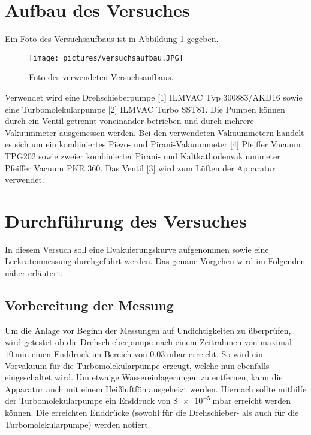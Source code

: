 \section{Aufbau des Versuches}
\label{sec:aufbau}
Ein Foto des Versuchsaufbaus ist in Abbildung \ref{fig:versuchsaufbau} gegeben.
\begin{figure}[H]
  \centering
  \caption{Foto des verwendeten Versuchsaufbaus.}
  \label{fig:versuchsaufbau}
  \texttt{[image: pictures/versuchsaufbau.JPG]}
\end{figure}
\noindent
Verwendet wird eine Drehschieberpumpe [1] ILMVAC Typ 300883/AKD16 sowie eine Turbomolekularpumpe [2]
ILMVAC Turbo SST81. Die Pumpen können durch ein Ventil getrennt voneinander betrieben und durch mehrere
Vakuummeter ausgemessen werden.
Bei den verwendeten Vakuummetern handelt es sich um ein kombiniertes
Piezo- und Pirani-Vakuummeter [4] Pfeiffer Vacuum TPG202 sowie zweier kombinierter Pirani- und Kaltkathodenvakuummeter
Pfeiffer Vacuum PKR 360. Das Ventil [3] wird zum Lüften der Apparatur verwendet.

\section{Durchführung des Versuches}
\label{sec:Durchführung}
In diesem Versuch soll eine Evakuierungskurve aufgenommen sowie eine Leckratenmessung
durchgeführt werden. Das genaue Vorgehen wird im Folgenden näher erläutert.

\subsection{Vorbereitung der Messung}
\label{subsec:vorbereitung}
Um die Anlage vor Beginn der Messungen auf Undichtigkeiten zu überprüfen, wird getestet
ob die Drehschieberpumpe nach einem Zeitrahmen von maximal $\SI{10}{\minute}$ einen Enddruck
im Bereich von $\SI{0.03}{\milli\bar}$ erreicht. So wird ein Vorvakuum für die Turbomolekularpumpe
erzeugt, welche nun ebenfalls eingeschaltet wird. Um etwaige Wassereinlagerungen zu entfernen,
kann die Apparatur auch mit einem Heißluftfön ausgeheizt werden. Hiernach sollte mithilfe
der Turbomolekularpumpe ein Enddruck von $\SI{8e-5}{\milli\bar}$ erreicht werden können.
Die erreichten Enddrücke (sowohl für die Drehschieber- als auch für die Turbomolekularpumpe)
werden notiert.

